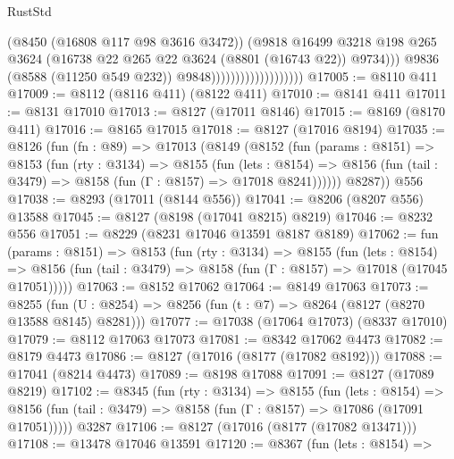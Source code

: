 \begin{lexlean}{RustStd}
\begin{coremodule}
                                            (@8450 (@16808 @117 @98 @3616 @3472))
                                            (@9818
                                              @16499
                                              @3218
                                              @198
                                              @265
                                              @3624
                                              (@16738
                                                @22
                                                @265
                                                @22
                                                @3624
                                                (@8801 (@16743 @22))
                                                @9734)))
                                          @9836
                                          (@8588 (@11250 @549 @232))
                                          @9848)))))))))))))))))))
@17005 := @8110 @411
@17009 := @8112 (@8116 @411) (@8122 @411)
@17010 := @8141 @411
@17011 := @8131 @17010
@17013 := @8127 (@17011 @8146)
@17015 := @8169 (@8170 @411)
@17016 := @8165 @17015
@17018 := @8127 (@17016 @8194)
@17035 := @8126
    (fun (fn : @89) =>
    @17013
      (@8149
        (@8152
          (fun (params : @8151) =>
          @8153
            (fun (rty : @3134) =>
            @8155
              (fun (lets : @8154) =>
              @8156 (fun (tail : @3479) => @8158 (fun (Γ : @8157) => @17018 @8241))))))
        @8287))
    @556
@17038 := @8293 (@17011 (@8144 @556))
@17041 := @8206 (@8207 @556) @13588
@17045 := @8127 (@8198 (@17041 @8215) @8219)
@17046 := @8232 @556
@17051 := @8229 (@8231 @17046 @13591 @8187 @8189)
@17062 := fun (params : @8151) =>
  @8153
    (fun (rty : @3134) =>
    @8155
      (fun (lets : @8154) =>
      @8156 (fun (tail : @3479) => @8158 (fun (Γ : @8157) => @17018 (@17045 @17051)))))
@17063 := @8152 @17062
@17064 := @8149 @17063
@17073 := @8255
    (fun (U : @8254) => @8256 (fun (t : @7) => @8264 (@8127 (@8270 @13588 @8145) @8281)))
@17077 := @17038 (@17064 @17073) (@8337 @17010)
@17079 := @8112 @17063 @17073
@17081 := @8342 @17062 @4473
@17082 := @8179 @4473
@17086 := @8127 (@17016 (@8177 (@17082 @8192)))
@17088 := @17041 (@8214 @4473)
@17089 := @8198 @17088
@17091 := @8127 (@17089 @8219)
@17102 := @8345
    (fun (rty : @3134) =>
    @8155
      (fun (lets : @8154) =>
      @8156 (fun (tail : @3479) => @8158 (fun (Γ : @8157) => @17086 (@17091 @17051)))))
    @3287
@17106 := @8127 (@17016 (@8177 (@17082 @13471)))
@17108 := @13478 @17046 @13591
@17120 := @8367
    (fun (lets : @8154) =>

\end{coremodule}
\end{lexlean}
